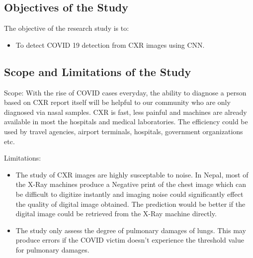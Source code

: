 
\subsection{Objectives of the Study}

The objective of the research study is to:
\begin{itemize}
    \item  To detect COVID 19 detection from CXR images using CNN. 
\end{itemize}

\subsection{Scope and Limitations of the Study}

Scope: With the rise of COVID cases everyday, the ability to diagnose a person based on CXR report itself will be helpful to our community who are only diagnosed via nasal samples. CXR is fast, less painful and machines are already available in most the hospitals and medical laboratories. The efficiency could be used by travel agencies, airport terminals, hospitals, government organizations etc.

\vspace{10pt}
Limitations:
\begin{itemize}
    \item The study of CXR images are highly susceptable to noise. In Nepal, most of the X-Ray machines produce a Negative print of the chest image which can be difficult to digitize instantly and imaging noise could significantly effect the quality of digital image obtained. The prediction would be better if the digital image could be retrieved from the X-Ray machine directly.
    \item The study only assess the degree of pulmonary damages of lungs. This may produce errors if the COVID victim doesn't experience the threshold value for pulmonary damages.
\end{itemize}  


